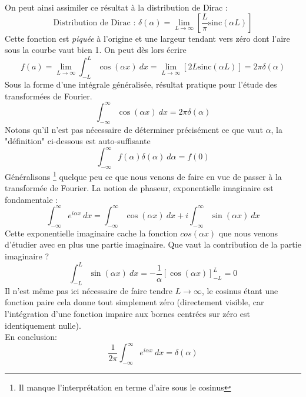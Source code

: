 On peut ainsi assimiler ce résultat à la distribution de Dirac :
\begin{equation}
\text{Distribution de Dirac : } \delta(\alpha) = \lim\limits_{L\rightarrow\infty}\left[
\dfrac{L}{\pi}\text{sinc}(\alpha L)\right]
\end{equation}
Cette fonction est \textit{piquée} à l’origine et une largeur tendant vers zéro dont l'aire
sous la courbe vaut bien 1. On peut dès lors écrire
\begin{equation}
f(a) = \lim\limits_{L\rightarrow\infty} \int_{-L}^L \cos(\alpha x)\ dx = \lim\limits_{L 
\rightarrow \infty}[2L\text{sinc}(\alpha L)] = 2\pi \delta(\alpha)
\end{equation}
Sous la forme d'une intégrale généralisée, résultat pratique pour l'étude des transformées 
de Fourier.
\begin{equation}
\int_{-\infty}^\infty \cos(\alpha x)\ dx = 2\pi \delta (\alpha)
\end{equation}
Notons qu'il n'est pas nécessaire de déterminer précisément ce que vaut $\alpha$, la 
"définition" ci-dessous est auto-suffisante
\begin{equation}
\int_{-\infty}^\infty f(\alpha)\delta(\alpha)\ d\alpha = f(0)
\end{equation}
Généralisons \footnote{Il manque l'interprétation en terme d'aire sous le cosinus} quelque
 peu ce que nous venons de faire en vue de passer à la transformée de 
Fourier. La notion de phaseur, exponentielle imaginaire est fondamentale :
\begin{equation}
\int_{-\infty}^\infty e^{i\alpha x}\ dx = \int_{-\infty}^\infty \cos(\alpha x)\ dx + i
\int_{-\infty}^\infty \sin(\alpha x)\ dx
\end{equation}
Cette exponentielle imaginaire cache la fonction $cos(\alpha x)$ que nous venons d'étudier 
avec en plus une partie imaginaire. Que vaut la contribution de la partie imaginaire ? 
\begin{equation}
\int_{-L}^L \sin(\alpha x)\ dx = -\frac{1}{\alpha}\left[\cos(\alpha x)\right]^L_{-L} = 0
\end{equation}
Il n'est même pas ici nécessaire de faire tendre $L\rightarrow\infty$, le cosinus étant 
une fonction paire cela donne tout simplement zéro (directement visible, car l'intégration 
d'une fonction impaire aux bornes centrées sur zéro est identiquement nulle). \\
En conclusion:
\begin{equation}
\dfrac{1}{2\pi}\int_{-\infty}^\infty e^{i\alpha x}\ dx  = \delta(\alpha)
\end{equation}

